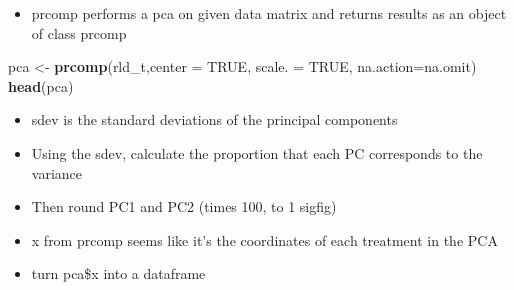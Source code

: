 \documentclass[
]{article}
\newenvironment{Shaded}{\begin{snugshade}}{\end{snugshade}}
\newcommand{\DataTypeTok}[1]{\textcolor[rgb]{0.13,0.29,0.53}{#1}}
\newcommand{\DecValTok}[1]{\textcolor[rgb]{0.00,0.00,0.81}{#1}}
\newcommand{\KeywordTok}[1]{\textcolor[rgb]{0.13,0.29,0.53}{\textbf{#1}}}
\newcommand{\NormalTok}[1]{#1}
\newcommand{\OperatorTok}[1]{\textcolor[rgb]{0.81,0.36,0.00}{\textbf{#1}}}
\newcommand{\OtherTok}[1]{\textcolor[rgb]{0.56,0.35,0.01}{#1}}
\newcommand{\StringTok}[1]{\textcolor[rgb]{0.31,0.60,0.02}{#1}}
\providecommand{\tightlist}{%
  \setlength{\itemsep}{0pt}\setlength{\parskip}{0pt}}
\begin{document}
\begin{itemize}
\tightlist
\item
  prcomp performs a pca on given data matrix and returns results as an
  object of class prcomp
\end{itemize}

\begin{Shaded}
\begin{Highlighting}[]
\NormalTok{pca <-}\StringTok{ }\KeywordTok{prcomp}\NormalTok{(rld_t,}\DataTypeTok{center =} \OtherTok{TRUE}\NormalTok{, }\DataTypeTok{scale. =} \OtherTok{TRUE}\NormalTok{, }\DataTypeTok{na.action=}\NormalTok{na.omit)}
\KeywordTok{head}\NormalTok{(pca)}
\end{Highlighting}
\end{Shaded}

\begin{itemize}
\tightlist
\item
  sdev is the standard deviations of the principal components
\item
  Using the sdev, calculate the proportion that each PC corresponds to
  the variance
\item
  Then round PC1 and PC2 (times 100, to 1 sigfig)
\end{itemize}

\begin{Shaded}
\end{Shaded}

\begin{itemize}
\tightlist
\item
  x from prcomp seems like it's the coordinates of each treatment in the
  PCA
\item
  turn pca\$x into a dataframe
\end{itemize}

\begin{Shaded}
\end{Shaded}
\end{document}
